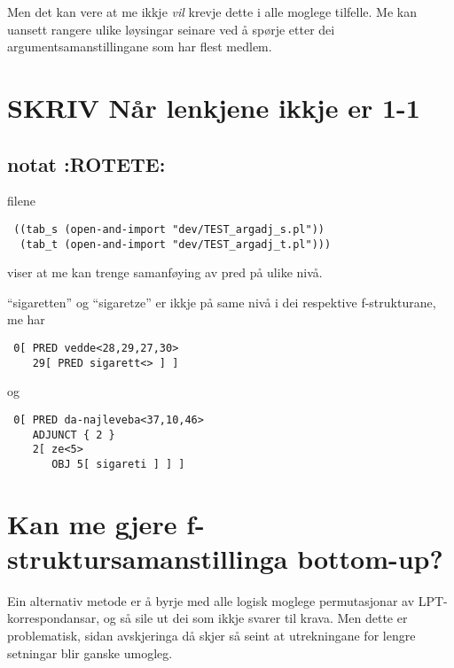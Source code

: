\documentclass[11pt,a4paper,oneside,draft]{book}
\begin{document}
Men det kan vere at me ikkje \emph{vil} krevje dette i alle moglege
tilfelle. Me kan uansett rangere ulike løysingar seinare ved å spørje
etter dei argumentsamanstillingane som har flest medlem.

\section{\textbf{SKRIV} Når lenkjene ikkje er 1-1}
\label{sec-4.2}


\subsection{notat \textbf{:ROTETE:}}
\label{sec-4.2.1}

filene 
\begin{verbatim}
 ((tab_s (open-and-import "dev/TEST_argadj_s.pl"))
  (tab_t (open-and-import "dev/TEST_argadj_t.pl")))
\end{verbatim}

viser at me kan trenge samanføying av pred på ulike nivå.

``sigaretten'' og ``sigaretze'' er ikkje på same nivå i dei respektive
f-strukturane, me har
\begin{verbatim}
 0[ PRED vedde<28,29,27,30>
    29[ PRED sigarett<> ] ]
\end{verbatim}

og
\begin{verbatim}
 0[ PRED da-najleveba<37,10,46>
    ADJUNCT { 2 }
    2[ ze<5>
       OBJ 5[ sigareti ] ] ]
\end{verbatim}

\section{Kan me gjere f-struktursamanstillinga bottom-up?}
\label{sec-4.3}

Ein alternativ metode er å byrje med alle logisk moglege permutasjonar
av LPT-korrespondansar, og så sile ut dei som ikkje svarer til
krava. Men dette er problematisk, sidan avskjeringa då skjer så seint
at utrekningane for lengre setningar blir ganske umogleg.


 
\end{document}
